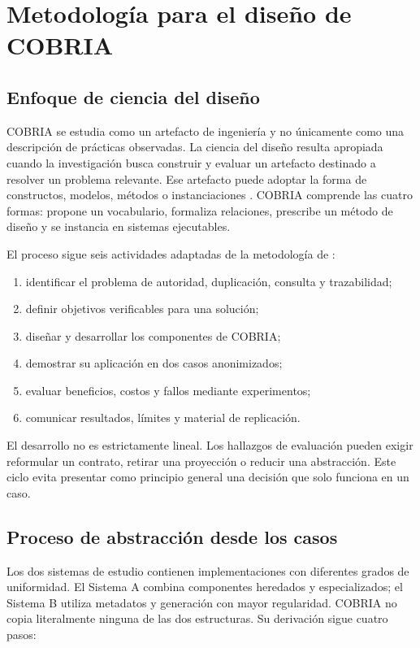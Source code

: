 \chapter{Metodología para el diseño de COBRIA}
\label{ch:metodologia-diseno}

\section{Enfoque de ciencia del diseño}

COBRIA se estudia como un artefacto de ingeniería y no únicamente como una descripción
de prácticas observadas. La ciencia del diseño resulta apropiada cuando la investigación
busca construir y evaluar un artefacto destinado a resolver un problema relevante. Ese
artefacto puede adoptar la forma de constructos, modelos, métodos o instanciaciones
\parencite{hevner2004designscience}. COBRIA comprende las cuatro formas: propone un
vocabulario, formaliza relaciones, prescribe un método de diseño y se instancia en
sistemas ejecutables.

El proceso sigue seis actividades adaptadas de la metodología de
\textcite{peffers2007dsrm}:

\begin{enumerate}[leftmargin=*]
  \item identificar el problema de autoridad, duplicación, consulta y trazabilidad;
  \item definir objetivos verificables para una solución;
  \item diseñar y desarrollar los componentes de COBRIA;
  \item demostrar su aplicación en dos casos anonimizados;
  \item evaluar beneficios, costos y fallos mediante experimentos;
  \item comunicar resultados, límites y material de replicación.
\end{enumerate}

El desarrollo no es estrictamente lineal. Los hallazgos de evaluación pueden exigir
reformular un contrato, retirar una proyección o reducir una abstracción. Este ciclo
evita presentar como principio general una decisión que solo funciona en un caso.

\section{Proceso de abstracción desde los casos}

Los dos sistemas de estudio contienen implementaciones con diferentes grados de
uniformidad. El Sistema A combina componentes heredados y especializados; el Sistema B
utiliza metadatos y generación con mayor regularidad. COBRIA no copia literalmente
ninguna de las dos estructuras. Su derivación sigue cuatro pasos:

